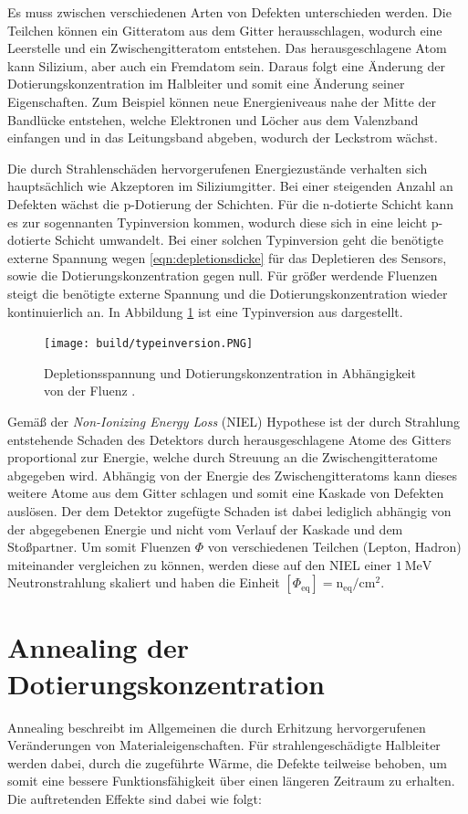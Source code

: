 Es muss zwischen verschiedenen Arten von Defekten unterschieden werden. Die Teilchen können ein Gitteratom aus dem
Gitter herausschlagen, wodurch eine Leerstelle und ein Zwischengitteratom entstehen. Das herausgeschlagene Atom
kann Silizium, aber auch ein Fremdatom sein. Daraus folgt eine Änderung der Dotierungskonzentration im
Halbleiter und somit eine Änderung seiner Eigenschaften. Zum Beispiel können neue Energieniveaus nahe der Mitte der
Bandlücke entstehen, welche Elektronen und Löcher aus dem Valenzband einfangen  und in das Leitungsband
abgeben, wodurch der Leckstrom wächst.


Die durch Strahlenschäden hervorgerufenen Energiezustände verhalten sich hauptsächlich wie Akzeptoren im Siliziumgitter. Bei
einer steigenden Anzahl an Defekten wächst die p-Dotierung der Schichten. Für die n-dotierte Schicht kann
es zur sogennanten Typinversion kommen, wodurch diese sich in eine leicht p-dotierte Schicht umwandelt. Bei einer
solchen Typinversion
geht die benötigte externe Spannung wegen \ref{eqn:depletionsdicke} für das Depletieren des Sensors,
sowie die Dotierungskonzentration gegen null.
Für größer werdende Fluenzen steigt die benötigte externe Spannung und die
Dotierungskonzentration wieder kontinuierlich an.
In Abbildung \ref{fig:typeinversion} ist eine Typinversion aus \cite{typinversion} dargestellt.

\begin{figure}
  \centering
    \texttt{[image: build/typeinversion.PNG]}
\caption{Depletionsspannung und Dotierungskonzentration in Abhängigkeit von der Fluenz \cite{typinversion}.}
\label{fig:typeinversion}
\end{figure}

Gemäß der \textit{Non-Ionizing Energy Loss} (NIEL) Hypothese ist der durch Strahlung entstehende Schaden des Detektors durch
herausgeschlagene Atome des Gitters proportional zur Energie, welche durch Streuung an die Zwischengitteratome abgegeben wird.
Abhängig von der Energie des Zwischengitteratoms kann dieses weitere Atome aus dem Gitter schlagen und somit
eine Kaskade von Defekten auslösen. Der dem Detektor zugefügte Schaden ist dabei
lediglich abhängig von der abgegebenen Energie und nicht vom Verlauf der Kaskade und dem Stoßpartner.
Um somit Fluenzen $ \Phi$ von verschiedenen Teilchen (Lepton, Hadron) miteinander vergleichen zu können, werden diese
auf den NIEL einer $\SI{1}{\mega\eV}$ Neutronstrahlung skaliert und haben die Einheit $[\Phi_{\mathrm{eq}}]=\mathrm{n_{\mathrm{eq}}/cm^2}$.


\section{Annealing der Dotierungskonzentration}
Annealing beschreibt im Allgemeinen die durch Erhitzung hervorgerufenen Veränderungen von Materialeigenschaften. Für strahlengeschädigte
Halbleiter werden dabei, durch die zugeführte Wärme, die Defekte teilweise behoben, um somit eine
bessere Funktionsfähigkeit über einen längeren Zeitraum zu erhalten. Die auftretenden Effekte sind dabei wie folgt:

